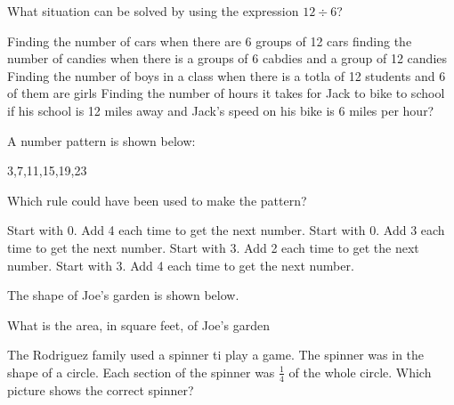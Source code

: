 \documentclass{exam}
\begin{document}
\begin{questions}
\question What situation can be solved by using the expression $12 \div 6$?
\begin{choices}
	\choice Finding the number of cars when there are 6 groups of 12 cars
	\choice finding the number of candies when there is a groups of 6 cabdies and a group of 12 candies
	\choice Finding the number of boys in a class when there is a totla of 12 students and 6 of them are girls
	\choice Finding the number of hours it takes for Jack to bike to school if his school is 12 miles away and Jack's speed on his bike is 6 miles per hour?	
\end{choices}

\question A number pattern is shown below:

3,7,11,15,19,23

Which rule could have been used to make the pattern?
\begin{choices}
	\choice Start with 0. Add 4 each time to get the next number. 
	\choice Start with 0. Add 3 each time to get the next number. 
	\choice Start with 3. Add 2 each time to get the next number. 
	\choice Start with 3. Add 4 each time to get the next number. 
\end{choices}

\question The shape of Joe's garden is shown below.

\begin{center}
\end{center}
What is the area, in square feet, of Joe's garden
\begin{choices}
\end{choices}


\question The Rodriguez family used a spinner ti play a game. The spinner was in the shape of a circle.  Each section of the spinner was $\frac{1}{4}$ of the whole circle. Which picture shows the correct spinner?


\end{questions}
\end{document}
